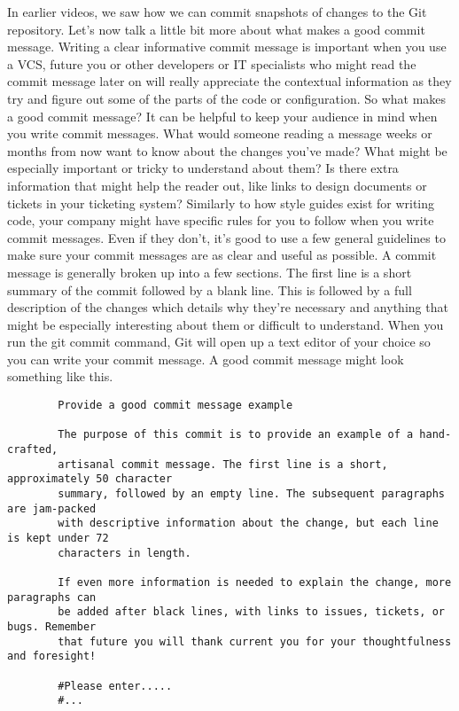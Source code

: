 	In earlier videos, we saw how we can commit snapshots of changes to the Git repository. Let's now talk a little bit more about what makes a good commit message. Writing a clear informative commit message is important when you use a VCS, future you or other developers or IT specialists who might read the commit message later on will really appreciate the contextual information as they try and figure out some of the parts of the code or configuration. So what makes a good commit message? It can be helpful to keep your audience in mind when you write commit messages.
	What would someone reading a message weeks or months from now want to know about the changes you've made? What might be especially important or tricky to understand about them? Is there extra information that might help the reader out, like links to design documents or tickets in your ticketing system? Similarly to how style guides exist for writing code, your company might have specific rules for you to follow when you write commit messages. Even if they don't, it's good to use a few general guidelines to make sure your commit messages are as clear and useful as possible. A commit message is generally broken up into a few sections. The first line is a short summary of the commit followed by a blank line. This is followed by a full description of the changes which details why they're necessary and anything that might be especially interesting about them or difficult to understand. When you run the git commit command, Git will open up a text editor of your choice so you can write your commit message. A good commit message might look something like this.
	
	\begin{verbatim}
		Provide a good commit message example
		
		The purpose of this commit is to provide an example of a hand-crafted,
		artisanal commit message. The first line is a short, approximately 50 character
		summary, followed by an empty line. The subsequent paragraphs are jam-packed
		with descriptive information about the change, but each line is kept under 72
		characters in length.
		
		If even more information is needed to explain the change, more paragraphs can
		be added after black lines, with links to issues, tickets, or bugs. Remember
		that future you will thank current you for your thoughtfulness and foresight!
		
		#Please enter.....
		#...
	\end{verbatim}
	
